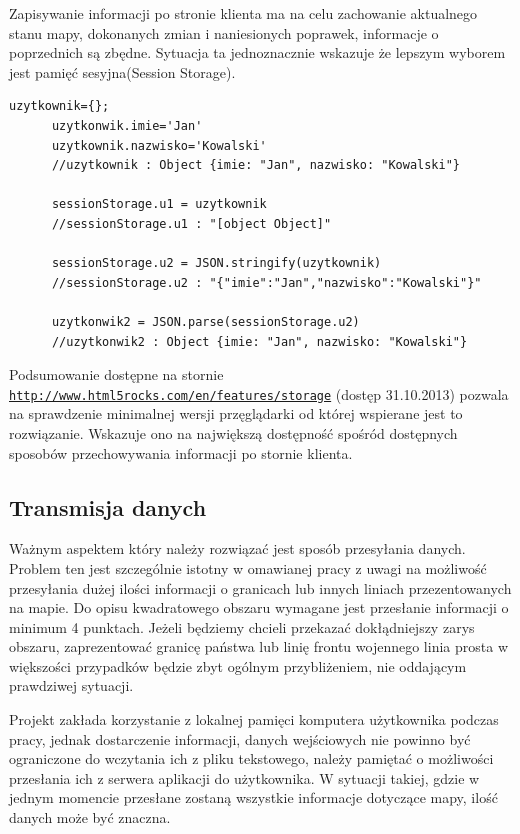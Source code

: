 Zapisywanie informacji po stronie klienta ma na celu zachowanie aktualnego stanu mapy, dokonanych zmian i naniesionych poprawek, informacje o poprzednich są zbędne. Sytuacja ta jednoznacznie wskazuje że lepszym wyborem jest pamięć sesyjna(Session Storage).

\lstset{language=JavaScript}
\label{lis:Namestorage}
\begin{lstlisting}[caption=Wykorzystanie Storage]
      uzytkownik={};
      uzytkonwik.imie='Jan'
      uzytkownik.nazwisko='Kowalski'
      //uzytkownik : Object {imie: "Jan", nazwisko: "Kowalski"}

      sessionStorage.u1 = uzytkownik
      //sessionStorage.u1 : "[object Object]"

      sessionStorage.u2 = JSON.stringify(uzytkownik)
      //sessionStorage.u2 : "{"imie":"Jan","nazwisko":"Kowalski"}"

      uzytkonwik2 = JSON.parse(sessionStorage.u2)
      //uzytkonwik2 : Object {imie: "Jan", nazwisko: "Kowalski"}
\end{lstlisting}


Podsumowanie dostępne na stornie \underline{\texttt{http://www.html5rocks.com/en/features/storage}} (dostęp 31.10.2013) pozwala na sprawdzenie minimalnej wersji przęglądarki od której wspierane jest to rozwiązanie. Wskazuje ono na największą dostępność spośród dostępnych sposobów przechowywania informacji po stornie klienta.

\subsection{Transmisja danych}
\label{subsec:transmisjaDanych}

Ważnym aspektem który należy rozwiązać jest sposób przesyłania danych. Problem ten jest szczególnie istotny w omawianej pracy z uwagi na możliwość przesyłania dużej ilości informacji o granicach lub innych liniach przezentowanych na mapie. Do opisu kwadratowego obszaru wymagane jest przesłanie informacji o minimum 4 punktach. Jeżeli będziemy chcieli przekazać dokłądniejszy zarys obszaru, zaprezentować granicę państwa lub linię frontu wojennego linia prosta w większości przypadków będzie zbyt ogólnym przybliżeniem, nie oddającym prawdziwej sytuacji.

Projekt zakłada korzystanie z lokalnej pamięci komputera użytkownika podczas pracy, jednak dostarczenie informacji, danych wejściowych nie powinno być ograniczone do wczytania ich z pliku tekstowego, należy pamiętać o możliwości przesłania ich z serwera aplikacji do użytkownika. W sytuacji takiej, gdzie w jednym momencie przesłane zostaną wszystkie informacje dotyczące mapy, ilość danych może być znaczna.

